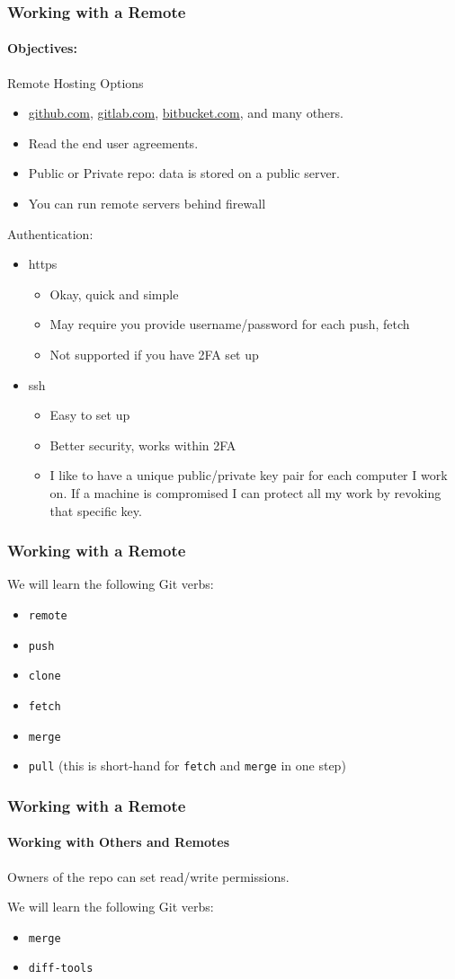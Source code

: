 \begin{frame}[t]
  \frametitle{Working with a Remote}
  \framesubtitle{Objectives:}
  Remote Hosting Options
  \begin{itemize}
    \item \url{github.com}, \url{gitlab.com}, \url{bitbucket.com}, and many others.
    \item Read the end user agreements. 
    \item Public or Private repo: data is stored on a public server.
    \item You can run remote servers behind firewall
  \end{itemize}

  Authentication:
  \begin{itemize}
    \item https
      \begin{itemize}
        \item Okay, quick and simple
        \item May require you provide username/password for each push, fetch
        \item Not supported if you have 2FA set up
      \end{itemize}
    \item ssh
      \begin{itemize}
        \item Easy to set up
        \item Better security, works within 2FA
        \item I like to have a unique public/private key pair for each computer I work on.  If a
          machine is compromised I can protect all my work by revoking that
          specific key.
      \end{itemize}
  \end{itemize}
\end{frame}

\begin{frame}[t]
  \frametitle{Working with a Remote}
  We will learn the following Git verbs:
  \begin{itemize}
    \item {\tt remote}
    \item {\tt push}
    \item {\tt clone}
    \item {\tt fetch}
    \item {\tt merge}
    \item {\tt pull} (this is short-hand for {\tt fetch} and {\tt merge} in one
      step)
  \end{itemize} 
\end{frame}

\begin{frame}[t]
  \frametitle{Working with a Remote}
  \framesubtitle{Working with Others and Remotes}
  Owners of the repo can set read/write permissions.

  We will learn the following Git verbs:
  \begin{itemize}
    \item {\tt merge}
    \item {\tt diff-tools}
  \end{itemize} 
\end{frame}


